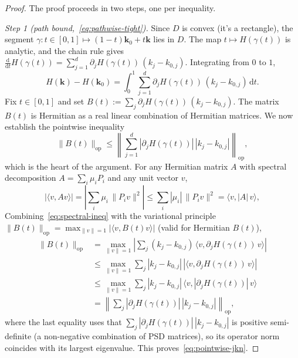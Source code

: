 \documentclass[11pt]{article}
\numberwithin{equation}{section}
\begin{document}
\begin{proof}
    The proof proceeds in two steps, one per inequality.

    \emph{Step 1 (path bound,~\eqref{eq:pathwise-tight}).}
    Since \(D\) is convex (it's a rectangle), the segment
    \(\gamma : t \in [0,1] \mapsto (1-t)\mathbf{k}_0 + t\mathbf{k}\) lies in \(D\).
    The map \(t \mapsto H(\gamma(t))\) is analytic, and the chain rule gives
    \(\frac{\mathrm{d}}{\mathrm{d}t} H(\gamma(t))
    = \sum_{j=1}^d \partial_j H(\gamma(t))\,(k_j - k_{0,j})\). Integrating from
    \(0\) to \(1\),
    \begin{equation}
        H(\mathbf{k}) - H(\mathbf{k}_0)
        = \int_0^1 \sum_{j=1}^d \partial_j H(\gamma(t))\,(k_j - k_{0,j})
        \,\mathrm{d}t.
        \label{eq:H-integral-form}
    \end{equation}
    Fix \(t \in [0,1]\) and set \(B(t) := \sum_j \partial_j H(\gamma(t))\,
    (k_j - k_{0,j})\). The matrix \(B(t)\) is Hermitian as a real linear
    combination of Hermitian matrices. We now establish the pointwise inequality
    \begin{equation}
        \|B(t)\|_\mathrm{op}
        \leq \left\| \sum_{j=1}^d |\partial_j H(\gamma(t))|\, |k_j - k_{0,j}|
        \right\|_\mathrm{op},
        \label{eq:pointwise-jkn}
    \end{equation}
    which is the heart of the argument. For any Hermitian matrix \(A\) with
    spectral decomposition \(A = \sum_i \mu_i P_i\) and any unit vector \(v\),
    \begin{equation}
        |\langle v, A v\rangle|
        = \left| \sum_i \mu_i\,\|P_i v\|^2 \right|
        \leq \sum_i |\mu_i|\,\|P_i v\|^2
        = \langle v, |A|\, v\rangle,
        \label{eq:spectral-ineq}
    \end{equation}
    Combining~\eqref{eq:spectral-ineq} with the variational principle
    \(\|B(t)\|_\mathrm{op} = \max_{\|v\|=1} |\langle v, B(t) v\rangle|\)
    (valid for Hermitian \(B(t)\)),
    \begin{align}
        \|B(t)\|_\mathrm{op}
         & = \max_{\|v\|=1}
        \left| \sum_j (k_j - k_{0,j})\, \langle v, \partial_j H(\gamma(t))\, v\rangle
        \right|                                                                  \\
         & \leq \max_{\|v\|=1}
        \sum_j |k_j - k_{0,j}|\, |\langle v, \partial_j H(\gamma(t))\, v\rangle| \\
         & \leq \max_{\|v\|=1}
        \sum_j |k_j - k_{0,j}|\, \langle v, |\partial_j H(\gamma(t))|\, v\rangle \\
         & = \left\| \sum_j |\partial_j H(\gamma(t))|\, |k_j - k_{0,j}|
        \right\|_\mathrm{op},
    \end{align}
    where the last equality uses that \(\sum_j |\partial_j H(\gamma(t))|\, |k_j -
    k_{0,j}|\) is positive semi-definite (a non-negative combination of PSD matrices), so
    its operator norm coincides with its largest eigenvalue. This
    proves~\eqref{eq:pointwise-jkn}.


\end{proof}
\end{document}
